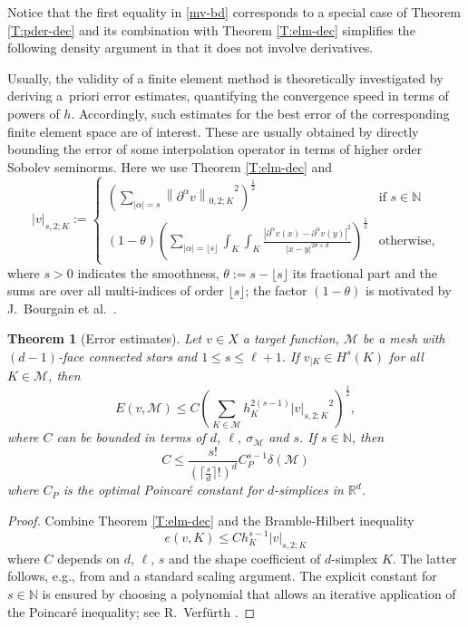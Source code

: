 \documentclass[a4paper]{amsart}
\numberwithin{equation}{section}
\theoremstyle{plain}
\newtheorem{thm}{Theorem}[section]
\theoremstyle{definition}
\begin{document}
Notice that the first equality in \eqref{mv-bd} corresponds to a special case 
of Theorem \ref{T:pder-dec} and its combination with Theorem \ref{T:elm-dec} 
simplifies the following density argument in that it does not involve 
derivatives.

\medskip Usually, the validity of a finite element method is theoretically 
investigated by deriving a~priori error estimates, quantifying the convergence 
speed in terms of powers of $h$.  Accordingly, such estimates for the best 
error of the corresponding finite element space are of interest.  These are 
usually obtained by directly bounding the error of some interpolation operator 
in terms of higher order Sobolev seminorms.  Here we use Theorem 
\ref{T:elm-dec} and
\begin{equation*}
 {{\left|{{v}}\right|_{{{s},{2};{K}}}}}
 {:=}
 \begin{cases}
  \left(
   \sum_{|\alpha|=s} {{\left\|{{\partial^\alpha v}}\right\|_{{0,{2};{K}}}}}^2
  \right)^{\frac12}
  & \text{if }s\in{\mathbb{N}}
\\
  (1-\theta)\left(
    \sum_{|\alpha|=\lfloor s\rfloor} \displaystyle
     \int_{K}\int_{K}
     \frac{|\partial^\alpha v(x) - \partial^\alpha v(y)|^2}{|x-y|^{2\theta+d}}
    \right)^{\frac12}
  & \text{otherwise,}
 \end{cases} 
\end{equation*}
where $s>0$ indicates the smoothness, $\theta {:=} s - \lfloor s \rfloor$ 
its fractional part and the sums are over all multi-indices of order $\lfloor s 
\rfloor$; the factor $(1-\theta)$ is motivated by J.\ Bourgain et al.\ 
\cite{Bourgain.Brezis.Mironescu:01}.

\begin{thm}[Error estimates]
\label{T:ErrEst}
Let $v\in X$ a target function, ${\mathcal{M}}$ be a mesh with $(d-1)$-face connected 
stars and $1\leq s\leq{\ell}+1$.  If $v_{|{K}}\in{H^{{s}}}({K})$ for all 
${K}\in{\mathcal{M}}$, then
\[
 E(v,{\mathcal{M}})
 \leq
 C \left(
   \sum_{{K}\in{\mathcal{M}}} h_{K}^{2(s-1)} {{\left|{{v}}\right|_{{{s},{2};{K}}}}}^2
 \right)^{\frac12},
\]
where $C$ can be bounded in terms of $d$, ${\ell}$, $\sigma_{\mathcal{M}}$ and $s$. 
If $s\in{\mathbb{N}}$, then
\[
 C \leq \frac{s!}{(\lceil\frac{s}{d}\rceil!)^d} C_P^{s-1}\delta({\mathcal{M}})
\]
where $C_P$ is the optimal Poincar\'e constant for $d$-simplices in ${{\mathbb{R}}^d}$.
\end{thm}

\begin{proof}
Combine Theorem \ref{T:elm-dec} and the Bramble-Hilbert inequality
\begin{equation}\label{BrambleHilbert}
 e(v,{K})
 \leq
 C h_{K}^{s-1} {{\left|{{v}}\right|_{{{s},{2};{K}}}}}
\end{equation}
where $C$ depends on $d$, ${\ell}$, $s$ and the shape coefficient of $d$-simplex 
${K}$.  The latter follows, e.g., from \cite[Theorems 3.2 and 
6.1]{Dupont.Scott:80} and a standard scaling argument.  The explicit constant 
for $s\in{\mathbb{N}}$ is ensured by choosing a polynomial that allows an iterative 
application of the Poincar\'e inequality; see R.~Verf\"urth 
\cite[\S3]{Verfuerth:99}.
\end{proof}
\end{document}
